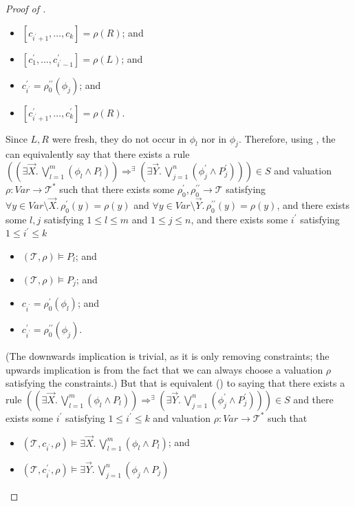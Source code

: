 \documentclass{article}
\begin{document}
\begin{proof}[Proof of ]
\begin{itemize}
    \item $[c_{i^\prime+1},\ldots,c_k] = \rho(R)$; and
    \item $[c^\prime_1,\ldots, c^\prime_{i^\prime-1}] = \rho(L)$; and
    \item $c^\prime_{i^\prime} = \rho_0^{\prime\prime}(\phi_j)$; and
    \item $[c^\prime_{i^\prime+1},\ldots,c^\prime_k] = \rho(R)$.
\end{itemize}
Since $L,R$ were fresh, they do not occur in $\phi_l$ nor in $\phi_j$.
Therefore, using , the can equivalently say that
there exists a rule $((\exists \vec{X}.\, \bigvee_{l=1}^{m} (\phi_l \land P_l)) \Rightarrow^\exists (\exists \vec{Y}.\, \bigvee_{j=1}^{n} (\phi^\prime_j \land P^\prime_j))) \in S$
and valuation $\rho : \mathit{Var} \to \mathcal{T}^*$ such that
there exists some $\rho_0^\prime,\rho_0^{\prime\prime} \to \mathcal{T}$
satisfying $\forall y \in \mathit{Var} \setminus \vec{X}.\, \rho_0^\prime(y) = \rho(y)$
and $\forall y \in \mathit{Var} \setminus \vec{Y}.\, \rho_0^{\prime\prime}(y) = \rho(y)$,
and there exists some $l,j$ satisfying $1 \leq l \leq m$ and $1 \leq j \leq n$,
and there exists some $i^\prime$ satisfying $1 \leq i^\prime \leq k$
\begin{itemize}
    \item $(\mathcal{T}, \rho) \vDash P_l$; and
    \item $(\mathcal{T}, \rho) \vDash P_j$; and
    \item $c_{i^\prime} = \rho_0^\prime(\phi_l)$; and
    \item $c^\prime_{i^\prime} = \rho_0^{\prime\prime}(\phi_j)$.
\end{itemize}
(The downwards implication is trivial, as it is only removing constraints; the upwards implication
is from the fact that we can always choose a valuation $\rho$ satisfying the constraints.)
But that is equivalent () to saying that 
there exists a rule $((\exists \vec{X}.\, \bigvee_{l=1}^{m} (\phi_l \land P_l)) \Rightarrow^\exists (\exists \vec{Y}.\, \bigvee_{j=1}^{n} (\phi^\prime_j \land P^\prime_j))) \in S$
and there exists some $i^\prime$ satisfying $1 \leq i^\prime \leq k$
and valuation $\rho : \mathit{Var} \to \mathcal{T}^*$ such that
\begin{itemize}
    \item $(\mathcal{T}, c_{i^\prime}, \rho) \vDash \exists \vec{X}.\, \bigvee_{l=1}^{m} (\phi_l \land P_l)$; and
    \item $(\mathcal{T}, c^\prime_{i^\prime}, \rho) \vDash \exists \vec{Y}.\, \bigvee_{j=1}^{n} (\phi_j \land P_j)$

\end{itemize}
\end{proof}
\end{document}
